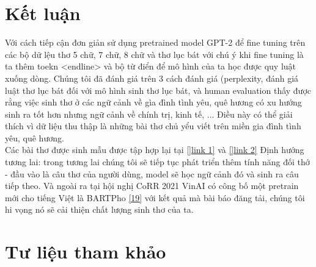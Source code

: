\documentclass[a4paper]{article}
\theoremstyle{definition}
\begin{document}
\newpage






\section{Kết luận}
Với cách tiếp cận đơn giản sử dụng pretrained model GPT-2 để fine tuning trên các bộ dữ lệu thơ 5 chữ, 7 chữ, 8 chữ và thơ lục bát với chú ý khi fine tuning là ta thêm toekn <endline> và bộ từ điển để mô hình của ta học được quy luật xuống dòng. Chúng tôi đã đánh giá trên 3 cách đánh giá (perplexity, đánh giá luật thơ lục bát đối với mô hình sinh thơ lục bát, và human evaluation thấy được rằng việc sinh thơ ở các ngữ cảnh về gìa đình tình yêu, quê hương có xu hướng sinh ra tốt hơn nhưng ngữ cảnh về chính trị, kinh tế, ... Điều này có thể giải thích vì dữ liệu thu thập là những bài thơ chủ yểu viết trên miền gia đình tình yêu, quê hương. \\

Các bài thơ được sinh mẫu được tập hợp lại tại \href{https://docs.google.com/document/d/1sY8Tu338GKSADCaPOD5k6xwEup9CImZg1dTlMnnN8Z8/edit#heading=h.gjrc6wgpnklp}{[]link 1]} và \href{https://drive.google.com/drive/folders/1fHVltUx2b5-7ViffQqSPe07KLlotM-ME}{[]link 2]}
Định hướng tương lai: trong tương lai chúng tôi sẽ tiếp tục phát triển thêm tính năng đối thớ - đầu vào là câu thơ của người dùng, model sẽ học ngữ cảnh đó và sinh ra câu tiếp theo. Và ngoài ra tại hội nghị CoRR 2021 VinAI có công bố một pretrain mới cho tiếng Việt là BARTPho \href{https://arxiv.org/abs/2109.09701}{[19]} với kết quả mà bài báo đăng tải, chúng tôi hi vọng nó sẽ cải thiện chất lượng sinh thơ của ta. 
\newpage
\section{Tư liệu tham khảo}
\end{document}
